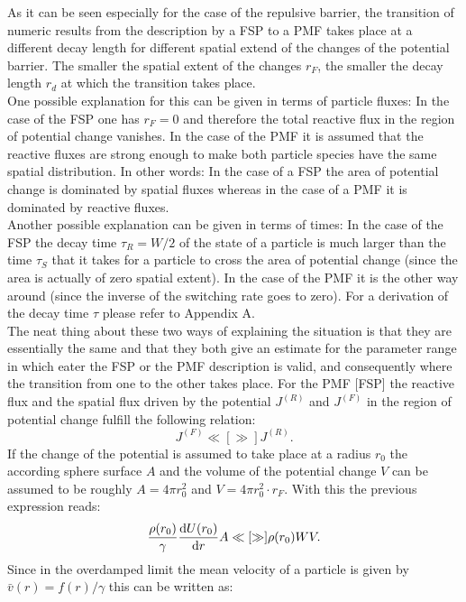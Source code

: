 As it can be seen especially for the case of the repulsive barrier, the transition of numeric results from the description by a FSP to a PMF takes place at a different decay length for different spatial extend of the changes of the potential barrier.  The smaller the spatial extent of the changes $r_F$, the smaller the decay length $r_d$ at which the transition takes place. \\
One possible explanation for this can be given in terms of particle fluxes: In the case of the FSP one has $r_F=0$ and therefore the total reactive flux in the region of potential change vanishes. In the case of the PMF it is assumed that the reactive fluxes are strong enough to make both particle species have the same spatial distribution. In other words: In the case of a FSP the area of potential change is dominated by spatial fluxes whereas in the case of a PMF it is dominated by reactive fluxes.\\
Another possible explanation can be given in terms of times: In the case of the FSP the decay time $\tau_R = W/2$ of the state of a particle is much larger than the time $\tau_S$ that it takes for a particle to cross the area of potential change (since the area is actually of zero spatial extent). In the case of the PMF it is the other way around (since the inverse of the switching rate goes to zero). For a derivation of the decay time $\tau$ please refer to Appendix A.\\
The neat thing about these two ways of explaining the situation is that they are essentially the same and that they both give  an estimate for the parameter range in which eater the FSP or the PMF description is valid, and consequently where the transition from one to the other takes place.
For the PMF [FSP] the reactive flux and the spatial flux driven by the potential $J^{(R)}$ and $J^{(F)}$ in the region of potential change fulfill the following relation:
\begin{equation}
    J^{(F)} \ll[\gg] J^{(R)}.
\end{equation}
If the change of the potential is assumed to take place at a radius $r_0$ the according sphere surface $A$ and the volume of the potential change $V$ can be assumed to be roughly $A=4 \pi r_0^2$ and $V=4 \pi r_0^2\cdot r_F$. With this the previous expression reads:
\begin{equation}
    \frac{\rho(r_0)}{\gamma}\frac{{\rm d}U(r_0)}{{\rm d}r} A \ll[\gg]\rho(r_0) W V.
\end{equation}
    Since in the overdamped limit the mean velocity of a particle is given by $\bar{v}(r) = f(r)/\gamma$ this can be written as:
